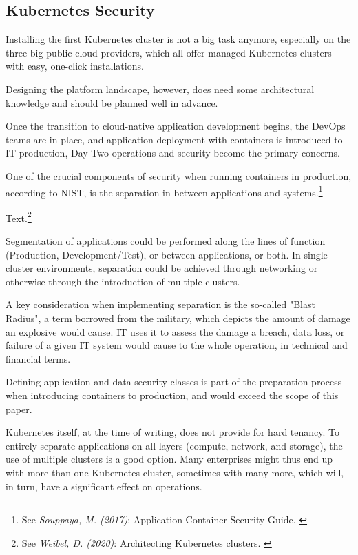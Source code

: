 \subsection{Kubernetes Security}

Installing the first Kubernetes cluster is not a big task anymore, especially on the three big public cloud providers, which all offer managed Kubernetes clusters with easy, one-click installations.

Designing the platform landscape, however, does need some architectural knowledge and should be planned well in advance.

Once the transition to cloud-native application development begins, the DevOps teams are in place, and application deployment with containers is introduced to IT production, Day Two operations and security become the primary concerns.

One of the crucial components of security when running containers in production, according to NIST, is the separation in between applications and systems.\footnote{See \textit{Souppaya, M. (2017)}: Application Container Security Guide. \cite{sp800-190}}

Text.\footnote{See \textit{Weibel, D. (2020)}: Architecting Kubernetes clusters. \cite{howMany}}

Segmentation of applications could be performed along the lines of function (Production, Development/Test), or between applications, or both. In single-cluster environments, separation could be achieved through networking or otherwise through the introduction of multiple clusters. 

A key consideration when implementing separation is the so-called "Blast Radius", a term borrowed from the military, which depicts the amount of damage an explosive would cause. IT uses it to assess the damage a breach, data loss, or failure of a given IT system would cause to the whole operation, in technical and financial terms.

Defining application and data security classes is part of the preparation process when introducing containers to production, and would exceed the scope of this paper.

Kubernetes itself, at the time of writing, does not provide for hard tenancy. To entirely separate applications on all layers (compute, network, and storage), the use of multiple clusters is a good option. Many enterprises might thus end up with more than one Kubernetes cluster, sometimes with many more, which will, in turn, have a significant effect on operations.

